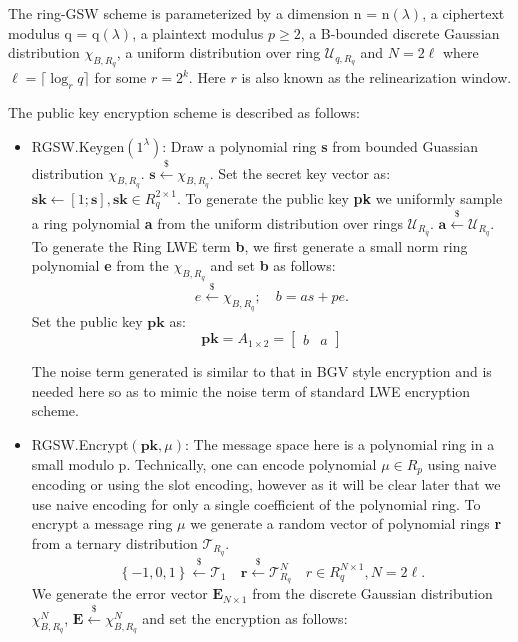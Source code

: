 \documentclass[10pt,journal,compsoc]{IEEEtran}
\theoremstyle{definition}
\begin{document}
The ring-GSW scheme is parameterized by a dimension n = n$\left(\lambda\right)$, a ciphertext modulus q = q$\left(\lambda\right)$, a plaintext modulus $p \geq 2$, a B-bounded discrete Gaussian distribution $\chi_{B,R_q}$, a uniform distribution over ring $\mathcal{U}_{q,R_q}$ and $N = 2\ell$ where $\ell = \lceil \log_r q\rceil$ for some $r = 2^k$. Here $r$ is also known as the relinearization window.

The public key encryption scheme is described as follows:

\begin{itemize}
\item RGSW.Keygen$\left(1^\lambda\right)$: Draw a polynomial ring \textbf{s} from bounded Guassian distribution $\chi_{B,R_q}$. $\textbf{s} \xleftarrow {\$}\chi_{B,R_q}$. Set the secret key vector as:
$\textbf{sk} \leftarrow [1;\textbf{s}], \textbf{sk} \in R_q^{2\times 1}$. 
To generate the public key \textbf{pk} we uniformly sample a ring polynomial \textbf{a} from the uniform distribution over rings $\mathcal{U}_{R_q}$. $\textbf{a} \xleftarrow{\$} \mathcal{U}_{R_q}$. To generate the Ring LWE term \textbf{b}, we first generate a small norm ring polynomial \textbf{e} from the $\chi_{B,R_q}$ and set \textbf{b} as follows:\\
$$e \xleftarrow{\$} \chi_{B,R_q};\quad b = as + pe.$$
Set the public key $\textbf{pk}$ as:  \[
\textbf{pk} = A_{1 \times 2} =
  \begin{bmatrix}
    b & a
  \end{bmatrix}
\]

The noise term generated is similar to that in BGV style encryption and is needed here so as to mimic the noise term of standard LWE encryption scheme.
\\
\item RGSW.Encrypt$\left( \textbf{pk},\mu \right)$: The message space here is a polynomial ring in a small modulo p. Technically, one can encode polynomial $\mu \in R_p$ using naive encoding or using the slot encoding, however as it will be clear later that we use naive encoding for only a single coefficient of the polynomial ring. To encrypt a message ring $\mu$ we generate a random vector of polynomial rings \textbf{r} from a ternary distribution $\mathcal{T}_{R_q}$.
$$\left\{ -1,0,1 \right\} \xleftarrow{\$} \mathcal{T}_{1} \quad \textbf{r} \xleftarrow{\$} \mathcal{T}_{R_q}^N \quad r \in R_q^{N\times 1}, N = 2\ell.$$
We generate the error vector $\textbf{E}_{N\times 1}$ from the discrete Gaussian distribution $\chi_{B,R_q}^N$, $\textbf{E} \xleftarrow{\$} \chi_{B,R_q}^N$ and set the encryption as follows:


\end{itemize}
\end{document}
